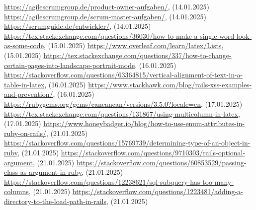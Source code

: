 \renewcommand\bibname{Quellenverzeichnis}
\begin{thebibliography}{9}
     \url{https://agilescrumgroup.de/product-owner-aufgaben/}, (14.01.2025)
     \url{https://agilescrumgroup.de/scrum-master-aufgaben/}, (14.01.2025)
     \url{https://scrumguide.de/entwickler/}, (14.01.2025)
     \url{https://tex.stackexchange.com/questions/36030/how-to-make-a-single-word-look-as-some-code}, (15.01.2025)
     \url{https://www.overleaf.com/learn/latex/Lists}, (15.01.2025)
     \url{https://tex.stackexchange.com/questions/337/how-to-change-certain-pages-into-landscape-portrait-mode}, (16.01.2025)
     \url{https://stackoverflow.com/questions/63364815/vertical-alignment-of-text-in-a-table-in-latex}, (16.01.2025)
     \url{https://www.stackhawk.com/blog/rails-xss-examples-and-prevention/}, (16.01.2025)
     \url{https://rubygems.org/gems/cancancan/versions/3.5.0?locale=en}, (17.01.2025)
     \url{https://tex.stackexchange.com/questions/131867/using-multicolumn-in-latex}, (17.01.2025)
     \url{https://www.honeybadger.io/blog/how-to-use-enum-attributes-in-ruby-on-rails/}, (21.01.2025)
     \url{https://stackoverflow.com/questions/15769739/determining-type-of-an-object-in-ruby}, (21.01.2025)
     \url{https://stackoverflow.com/questions/9710303/rails-optional-argument}, (21.01.2025)
     \url{https://stackoverflow.com/questions/60853529/passing-class-as-argument-in-ruby}, (21.01.2025)
     \url{https://stackoverflow.com/questions/12238621/sql-subquery-has-too-many-columns}, (21.01.2025)
     \url{https://stackoverflow.com/questions/1223481/adding-a-directory-to-the-load-path-in-rails}, (21.01.2025)
\end{thebibliography}

